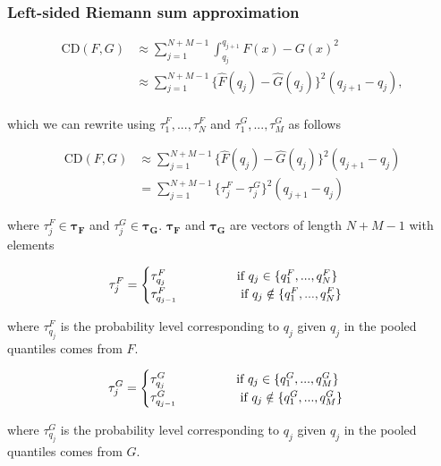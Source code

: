 \documentclass[
]{article}
\begin{document}
\hypertarget{left-sided-riemann-sum-approximation-1}{%
\subsubsection{Left-sided Riemann sum
approximation}\label{left-sided-riemann-sum-approximation-1}}

\begin{align}
\text{CD}(F,G) &\approx\sum^{N+M-1}_{j=1}\int^{q_{j+1}}_{q_j}{F(x)−G(x)}^2\\
&\approx\sum^{N+M-1}_{j=1}\{\hat{F}(q_j)-\hat{G}(q_j)\}^2(q_{j+1}-q_{j}),\\
\end{align}

which we can rewrite using \(\tau_1^F,...,\tau_N^F\) and
\(\tau_1^G,...,\tau_M^G\) as follows

\begin{align}
\text{CD}(F,G) 
&\approx\sum^{N+M-1}_{j=1}\{\hat{F}(q_j)-\hat{G}(q_j)\}^2(q_{j+1}-q_{j})\\
&=\sum^{N+M-1}_{j=1}\{\tau^F_j-\tau^G_j\}^2(q_{j+1}-q_{j})
\end{align}

where \(\tau^F_j \in \boldsymbol{\tau_F}\) and
\(\tau^G_j \in \boldsymbol{\tau_G}\). \(\boldsymbol{\tau_F}\) and
\(\boldsymbol{\tau_G}\) are vectors of length \(N+M-1\) with elements

\[
\tau^F_j=
\begin{cases}
\tau_{q_j}^F\hspace{2cm}\text{if }q_j\in \{q_1^F, ..., q_{N}^F\}\\
\tau_{q_{j-1}}^F\hspace{1.8cm}\text{if }q_j\notin \{q_1^F, ..., q_{N}^F\}\\
\end{cases}
\]

where \(\tau_{q_j}^F\) is the probability level corresponding to \(q_j\)
given \(q_j\) in the pooled quantiles comes from \(F\).

\[
\tau^G_j=
\begin{cases}
\tau_{q_j}^G\hspace{2cm}\text{if }q_j\in \{q_1^G, ..., q_{M}^G\}\\
\tau_{q_{j-1}}^G\hspace{1.8cm}\text{if }q_j\notin \{q_1^G, ..., q_{M}^G\}\\
\end{cases}
\]

where \(\tau_{q_j}^G\) is the probability level corresponding to \(q_j\)
given \(q_j\) in the pooled quantiles comes from \(G\).
\end{document}
